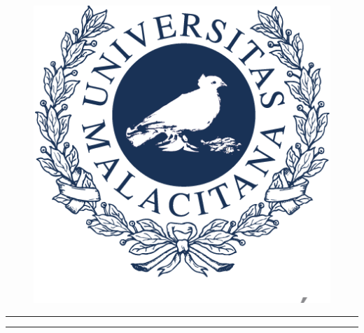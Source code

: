 \begin{titlepage}
  \centering
  \begin{figure}
    \centering
    \includegraphics[scale=0.2]{images/LogoUMA.png}
  \end{figure}
  {\bfseries\LARGE \universidad \par}
  \vspace{1cm}
  {\scshape\Large \grado \par}
  \vspace{3cm}
  \hrule
  \vspace{0.5cm}
  {\scshape\Huge \asignatura \par}
  {\itshape\Large \titulo \par}
  \vspace{0.5cm}
  \hrule
  \vfill
  {\Large \autor \par}
  \vfill
  {\Large \fecha \par}
\end{titlepage} 
